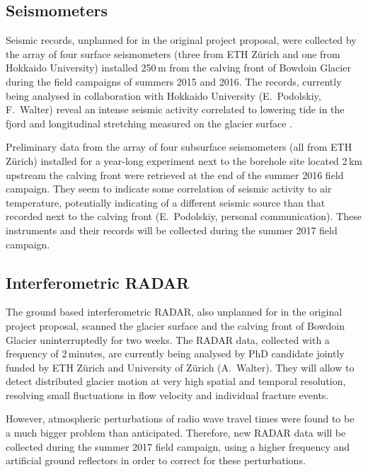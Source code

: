 \documentclass{article}
\begin{document}
\subsection{Seismometers}

Seismic records, unplanned for in the original project proposal, were collected
by the array of four surface seismometers (three from ETH Zürich and one from
Hokkaido University) installed 250\,m from the calving front of Bowdoin Glacier
during the field campaigns of summers 2015 and 2016. The records, currently
being analysed in collaboration with Hokkaido University (E.~Podolskiy,
F.~Walter) reveal an intense seismic activity correlated to lowering tide in
the fjord and longitudinal stretching measured on the glacier surface
\citep{Podolskiy.etal.2016, Podolskiy.etal.2017}.

Preliminary data from the array of four subsurface seismometers (all from ETH
Zürich) installed for a year-long experiment next to the borehole site located
2\,km upstream the calving front were retrieved at the end of the summer 2016
field campaign. They seem to indicate some correlation of seismic activity to
air temperature, potentially indicating of a different seismic source than that
recorded next to the calving front (E.~Podolskiy, personal communication).
These instruments and their records will be collected during the summer 2017
field campaign.


\subsection{Interferometric RADAR}

The ground based interferometric RADAR, also unplanned for in the original
project proposal,
scanned the glacier surface and the calving front of Bowdoin Glacier
uninterruptedly for two weeks. The RADAR data, collected with a frequency of
2\,minutes, are currently being analysed by PhD candidate jointly funded by
ETH Zürich and University of Zürich (A.~Walter). They will allow to detect
distributed glacier motion at very high spatial and temporal resolution,
resolving small fluctuations in flow velocity and individual fracture events.

However, atmospheric perturbations of radio wave travel times were found to be
a much bigger problem than anticipated. Therefore, new RADAR data will be
collected during the summer 2017 field campaign, using a higher frequency and
artificial ground reflectors in order to correct for these perturbations.
\end{document}
